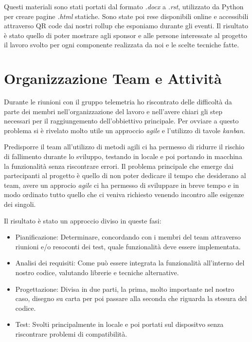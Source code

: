 Questi materiali sono stati portati dal formato \emph{.docx} a \emph{.rst}, utilizzato da Python per creare pagine \emph{.html} statiche.
Sono state poi rese disponibili online e accessibili attraverso QR code dai nostri rollup che esponiamo durante gli eventi.
Il risultato è stato quello di poter mostrare agli sponsor e alle persone interessate al progetto il lavoro svolto per ogni componente realizzata da noi
e le scelte tecniche fatte.

\newpage

\section{Organizzazione Team e Attività}


Durante le riunioni con il gruppo telemetria ho riscontrato delle difficoltà da parte dei membri
nell'organizzazione del lavoro e nell'avere chiari gli step necessari per il raggiungemento dell'obbiettivo principale.
Per ovviare a questo problema si è rivelato molto utile un approccio \emph{agile} e l'utilizzo di tavole \emph{kanban}.

Predisporre il team all'utilizzo di metodi agili ci ha permesso di ridurre il rischio di fallimento 
durante lo sviluppo, testando in locale e poi portando in macchina la funzionalità senza riscontrare errori.
Il problema principale che emerge dai partecipanti al progetto è quello di non poter dedicare
il tempo che desiderano al team, avere un approcio \emph{agile} ci ha permesso di sviluppare in breve tempo e in modo 
ordinato tutto quello che ci veniva richiesto venendo incontro alle esigenze dei singoli.

Il risultato è stato un approccio diviso in queste fasi:
 
\begin{itemize}
  \item Pianificazione: Determinare, concordando con i membri del team attraverso riunioni e/o resoconti dei test, quale funzionalità deve essere implementata.
  \item Analisi dei requisiti: Come può essere integrata la funzionalità all'interno del nostro codice, valutando librerie e tecniche alternative.  
  \item Progettazione: Divisa in due parti, la prima, molto importante nel nostro caso, disegno su carta per poi passare alla seconda che riguarda la stesura del codice. 
  \item Test: Svolti principalmente in locale e poi portati sul dispositvo senza riscontrare problemi di compatibilità.
\end{itemize}

